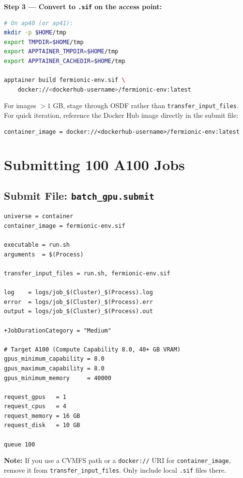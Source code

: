 \documentclass[11pt]{article}
\begin{document}
\textbf{Step 3 --- Convert to \texttt{.sif} on the access point:}

\begin{lstlisting}[language=bash]
# On ap40 (or ap41):
mkdir -p $HOME/tmp
export TMPDIR=$HOME/tmp
export APPTAINER_TMPDIR=$HOME/tmp
export APPTAINER_CACHEDIR=$HOME/tmp

apptainer build fermionic-env.sif \
    docker://<dockerhub-username>/fermionic-env:latest
\end{lstlisting}

For images $>1$ GB, stage through OSDF rather than \texttt{transfer\_input\_files}.
For quick iteration, reference the Docker Hub image directly in the submit file:

\begin{lstlisting}
container_image = docker://<dockerhub-username>/fermionic-env:latest
\end{lstlisting}

\section{Submitting 100 A100 Jobs}

\subsection{Submit File: \texttt{batch\_gpu.submit}}

\begin{lstlisting}
universe = container
container_image = fermionic-env.sif

executable = run.sh
arguments  = $(Process)

transfer_input_files = run.sh, fermionic-env.sif

log    = logs/job_$(Cluster)_$(Process).log
error  = logs/job_$(Cluster)_$(Process).err
output = logs/job_$(Cluster)_$(Process).out

+JobDurationCategory = "Medium"

# Target A100 (Compute Capability 8.0, 40+ GB VRAM)
gpus_minimum_capability = 8.0
gpus_maximum_capability = 8.0
gpus_minimum_memory     = 40000

request_gpus   = 1
request_cpus   = 4
request_memory = 16 GB
request_disk   = 10 GB

queue 100
\end{lstlisting}

\textbf{Note:} If you use a CVMFS path or a \texttt{docker://} URI for
\texttt{container\_image}, remove it from \texttt{transfer\_input\_files}.
Only include local \texttt{.sif} files there.
\end{document}
